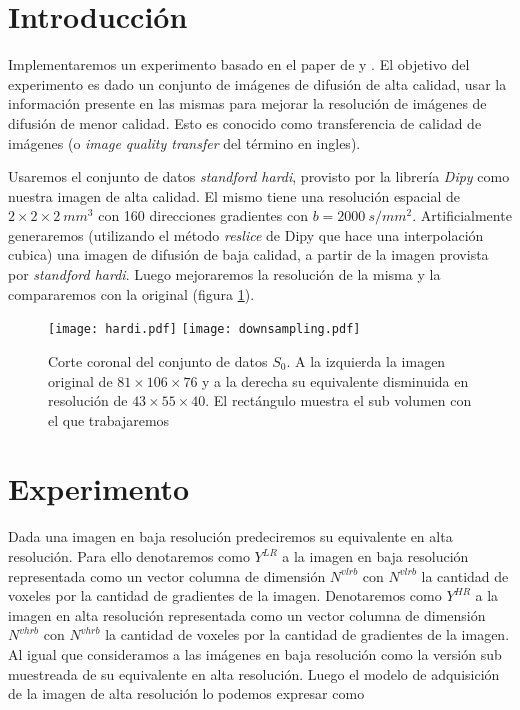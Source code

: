 \documentclass[a4paper,10pt]{article}%
\title{}
\author{Leonel Exequiel Gómez}
\begin{document}
\maketitle



\section{Introducción}
Implementaremos un experimento basado en el paper de \citet{Alexander2014} y \citet{Ning2016}. 
El objetivo del experimento es dado un conjunto de imágenes de difusión de 
alta calidad, usar la información presente en las mismas para mejorar la 
resolución de imágenes de difusión de menor calidad. Esto es conocido como 
transferencia de calidad de imágenes (o \textit{image quality transfer} del 
término en ingles). 

Usaremos el conjunto de datos \textit{standford hardi}, provisto por la 
librer\'ia \textit{Dipy} como nuestra imagen de alta calidad. El mismo tiene 
una resolución espacial de $2\times2\times2\ mm^3$ con 160 direcciones 
gradientes con $b=2000\ s/mm^2$. Artificialmente generaremos (utilizando el 
m\'etodo \textit{reslice} de Dipy que hace una interpolación cubica) una imagen 
de difusión de baja calidad, a partir de la imagen provista por \textit{standford 
hardi}. Luego mejoraremos la resolución de la misma y la 
compararemos con la original (figura \ref{inputimg}).


\begin{figure}[h]
\texttt{[image: hardi.pdf]}
\texttt{[image: downsampling.pdf]}
\caption{Corte coronal del conjunto de datos $S_0$. A la izquierda la imagen 
original de $81\times106\times76$ y a la derecha su equivalente disminuida en 
resolución de $43\times55\times40$. El rectángulo muestra el sub volumen con el 
que trabajaremos} 
\label{inputimg}
\end{figure}%



\section{Experimento}

Dada una imagen en baja resolución predeciremos su equivalente en alta 
resolución. Para ello denotaremos como $Y^{LR}$ a la imagen en baja resolución 
representada como un vector columna de dimensión $N^{vlrb}$ con $N^{vlrb}$ la 
cantidad de voxeles por la cantidad de gradientes de la imagen. Denotaremos 
como $Y^{HR}$ a la imagen en alta resolución representada como un vector 
columna de dimensión $N^{vhrb}$ con $N^{vhrb}$ la cantidad de voxeles por la 
cantidad de gradientes de la imagen. Al igual que \citep{Ning2016} consideramos 
a las imágenes en baja resolución como la versión sub muestreada de su 
equivalente en alta resolución. Luego el modelo de adquisición de la imagen de 
alta resolución lo podemos expresar como
\end{document}
